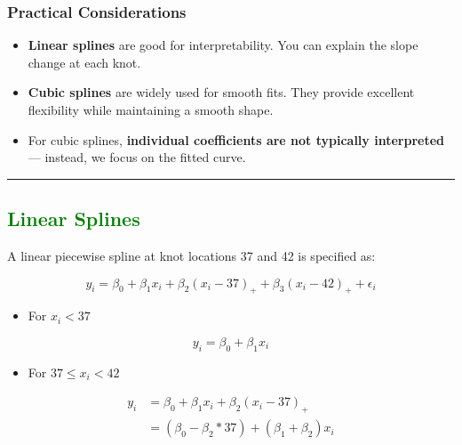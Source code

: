 \documentclass[
  letterpaper,
  DIV=11,
  numbers=noendperiod]{scrreprt}
\providecommand{\tightlist}{%
  \setlength{\itemsep}{0pt}\setlength{\parskip}{0pt}}\usepackage{longtable,booktabs,array}
\begin{document}
\hypertarget{practical-considerations}{%
\subsubsection*{Practical
Considerations}\label{practical-considerations}}

\begin{itemize}
\tightlist
\item
  \textbf{Linear splines} are good for interpretability. You can explain
  the slope change at each knot.
\item
  \textbf{Cubic splines} are widely used for smooth fits. They provide
  excellent flexibility while maintaining a smooth shape.
\item
  For cubic splines, \textbf{individual coefficients are not typically
  interpreted} --- instead, we focus on the fitted curve.
\end{itemize}

\begin{center}\rule{0.5\linewidth}{0.5pt}\end{center}

\hypertarget{section-23}{%
\subsection*{\texorpdfstring{\textcolor{green}{Linear Splines}}{}}\label{section-23}}

A linear piecewise spline at knot locations 37 and 42 is specified as:

\[
y_i  = \beta_0 + \beta_1 x_i + \beta_2 (x_i - 37)_{+} + \beta_3 (x_i - 42)_{+} + \epsilon_i 
\]

\begin{itemize}
\tightlist
\item
  For \(x_i<37\)
\end{itemize}

\[
y_i = \beta_0 + \beta_1 x_i
\]

\begin{itemize}
\tightlist
\item
  For \(37 \leq x_i < 42\)
\end{itemize}

\[
\begin{align*}
y_i & = \beta_0 + \beta_1 x_i + \beta_2 (x_i - 37)_+ \\
&=  (\beta_0 - \beta_2 * 37) + (\beta_1 + \beta_2) x_i
\end{align*}
\]
\end{document}
